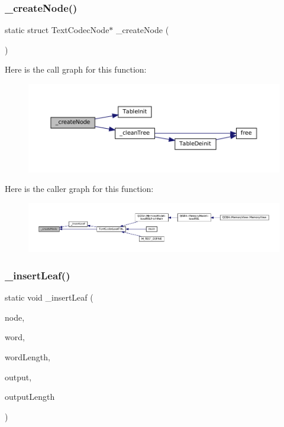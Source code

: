 \subsubsection{\texorpdfstring{\+\_\+create\+Node()}{\_createNode()}}
{\footnotesize\ttfamily static struct Text\+Codec\+Node$\ast$ \+\_\+create\+Node (\begin{DoxyParamCaption}\item[{void}]{ }\end{DoxyParamCaption})\hspace{0.3cm}{\ttfamily [static]}}

Here is the call graph for this function\+:
\nopagebreak
\begin{figure}[H]
\begin{center}
\leavevmode
\includegraphics[width=350pt]{text-codec_8c_a2a8c8d4c442ca97dc71895c2304b04ef_cgraph}
\end{center}
\end{figure}
Here is the caller graph for this function\+:
\nopagebreak
\begin{figure}[H]
\begin{center}
\leavevmode
\includegraphics[width=350pt]{text-codec_8c_a2a8c8d4c442ca97dc71895c2304b04ef_icgraph}
\end{center}
\end{figure}
\mbox{\label{text-codec_8c_ad10dba7b4d43d411ba0c4edbfe5d203c}} 
\subsubsection{\texorpdfstring{\+\_\+insert\+Leaf()}{\_insertLeaf()}}
{\footnotesize\ttfamily static void \+\_\+insert\+Leaf (\begin{DoxyParamCaption}\item[{struct Text\+Codec\+Node $\ast$}]{node,  }\item[{uint8\+\_\+t $\ast$}]{word,  }\item[{size\+\_\+t}]{word\+Length,  }\item[{uint8\+\_\+t $\ast$}]{output,  }\item[{size\+\_\+t}]{output\+Length }\end{DoxyParamCaption})\hspace{0.3cm}{\ttfamily [static]}}


